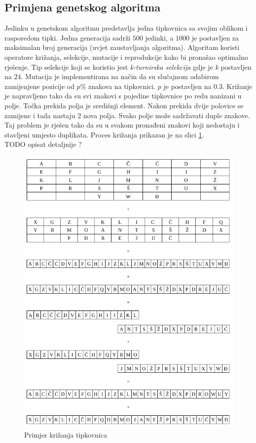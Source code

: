 \documentclass[times, utf8, zavrsni]{fer}
\begin{document}
\subsection{Primjena genetskog algoritma}
Jedinku u genetskom algoritmu predstavlja jedna tipkovnica sa svojim oblikom i rasporedom tipki. Jedna generacija sadrži $500$ jedinki, a $1000$ je postavljen za maksimalan broj generacija (uvjet zaustavljanja algoritma). Algoritam koristi operatore križanja, selekcije, mutacije i reprodukcije kako bi pronašao optimalno rješenje. Tip selekcije koji se koristio jest \emph{k-turnirska selekcija} gdje je \emph{k} postavljen na $24$. Mutacija je implementirana na način da su slučajnom odabirom zamijenjene pozicije od $p\%$ znakova na tipkovnici. $p$ je postavljen na $0.3$. Križanje je napravljeno tako da su svi znakovi s pojedine tipkovnice po redu nanizani u polje. Točka prekida polja je središnji element. Nakon prekida dvije polovice se zamijene i tada nastaju 2 nova polja. Svako polje može sadržavati duple znakove. Taj problem je rješen tako da su u svakom pronađeni znakovi koji nedostaju i stavljeni umjesto duplikata. Proces križanja prikazan je na slici \ref{fig:krizanje_primjer}. \\TODO opisat detaljnije ? 

\begin{figure}[htb]
\centering
\includegraphics[width=16cm]{img/krizanje_tip.png}
\caption{Primjer križanja tipkovnica}
\label{fig:krizanje_primjer}
\end{figure}
\end{document}
